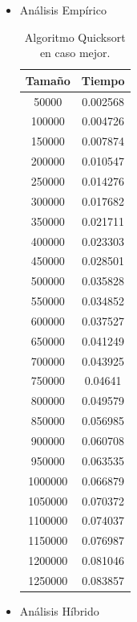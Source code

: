 \documentclass[a4paper,12pt,twoside]{article} %
\begin{document}
	\begin{itemize}
	\item Análisis Empírico
	
	\begin{table}[h]
	\begin{center}
		\begin{tabular}{|c|c|}
		\hline
		Tamaño & Tiempo \\
		\hline
		50000 & 0.002568 \\
		100000 & 0.004726 \\
		150000 & 0.007874 \\
		200000 & 0.010547 \\
		250000 & 0.014276 \\
		300000 & 0.017682 \\
		350000 & 0.021711 \\
		400000 & 0.023303 \\
		450000 & 0.028501 \\
		500000 & 0.035828 \\
		550000 & 0.034852 \\
		600000 & 0.037527 \\
		650000 & 0.041249 \\
		700000 & 0.043925 \\
		750000 & 0.04641 \\
		800000 & 0.049579 \\
		850000 & 0.056985 \\
		900000 & 0.060708 \\
		950000 & 0.063535 \\
		1000000 & 0.066879 \\
		1050000 & 0.070372 \\
		1100000 & 0.074037 \\
		1150000 & 0.076987 \\
		1200000 & 0.081046 \\
		1250000 & 0.083857 \\
		\hline
		\end{tabular}
	\end{center}
	\caption{Algoritmo Quicksort en caso mejor.}
\end{table}
\newpage

	
	\item Análisis Híbrido
	
\begin{figure}[h]
  \begin{center}
  

\end{center}
\end{figure}
\end{itemize}
\end{document}
